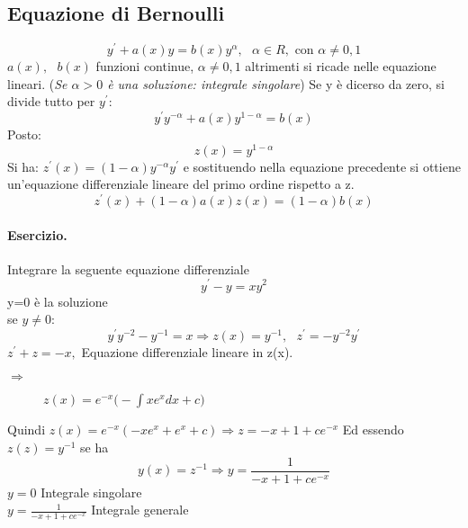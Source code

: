 \subsection{Equazione di Bernoulli}
\begin{equation*}
	y^\prime+a(x)y=b(x)y^\alpha, \text{ } \alpha\in R,\text{ con } \alpha\neq 0,1
\end{equation*}
$a(x),\text{ } b(x)$ funzioni continue, $\alpha\neq 0,1$ altrimenti si ricade nelle equazione lineari. (\textit{Se $\alpha>0$ è una soluzione: {\color{red} integrale singolare}}) Se y è dicerso da zero, si divide tutto per $y^\prime$:
\begin{equation*}
	y^\prime y^{-\alpha}+a(x)y^{1-\alpha}=b(x)
\end{equation*}
Posto:
 \begin{equation*}
	z(x)=y^{1-\alpha}
\end{equation*}
Si ha: $z^\prime(x)=(1-\alpha)y^{-\alpha}y^\prime$ e sostituendo nella equazione precedente si ottiene un'equazione differenziale lineare del primo ordine rispetto a z.
\begin{equation*}
	\boxed{z^\prime(x)+(1-\alpha)a(x)z(x)=(1-\alpha)b(x)}
\end{equation*}
\paragraph{Esercizio.} Integrare la seguente equazione differenziale
\begin{equation}
	y^\prime-y=xy^2
\end{equation}
y=0 è la soluzione\\
se $y\neq 0$:
\begin{equation*}
	y^\prime y^{-2}-y^{-1}=x\Rightarrow z(x)=y^{-1},\text{ } z^\prime=-y^{-2}y^\prime
\end{equation*}
$z^\prime+z=-x,$ Equazione differenziale lineare in z(x).
\begin{description}
	\item[$\Rightarrow$] $z(x)=e^{-x}\bigg(-\int xe^xdx+c\bigg)$ 
\end{description}
Quindi $z(x)=e^{-x}(-xe^x+e^x+c)\Rightarrow z=-x+1+ce^{-x}$ Ed essendo $z(z)=y^{-1}$ se ha
\begin{equation*}
	y(x)=z^{-1}\Rightarrow y=\frac{1}{-x+1+ce^{-x}}
\end{equation*}
$y=0$ Integrale singolare\\
$y=\frac{1}{-x+1+ce^{-x}}$ Integrale generale
